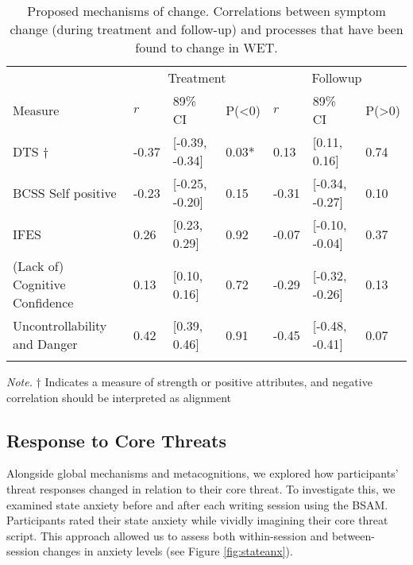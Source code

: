 \documentclass[
  man,floatsintext]{apa7}
\begin{document}
\begin{table}[tbp]

\begin{center}
\begin{threeparttable}

\caption{\label{tab:mechanisms.table}Proposed mechanisms of change. Correlations between symptom change (during treatment and follow-up) and processes that have been found to change in WET.}

\begin{tabular}{lllllll}
\toprule
 & \multicolumn{3}{c}{Treatment} & \multicolumn{3}{c}{Followup} \\
\cmidrule(r){2-4} \cmidrule(r){5-7}
Measure & $r$ & 89\% CI & P(<0) & $r$ & 89\% CI & P(>0)\\
\midrule
DTS † & -0.37 & {}[-0.39, -0.34] & 0.03* & 0.13 & {}[0.11, 0.16] & 0.74\\
BCSS Self positive & -0.23 & {}[-0.25, -0.20] & 0.15 & -0.31 & {}[-0.34, -0.27] & 0.10\\
IFES & 0.26 & {}[0.23, 0.29] & 0.92 & -0.07 & {}[-0.10, -0.04] & 0.37\\
(Lack of) Cognitive Confidence & 0.13 & {}[0.10, 0.16] & 0.72 & -0.29 & {}[-0.32, -0.26] & 0.13\\
Uncontrollability and Danger & 0.42 & {}[0.39, 0.46] & 0.91 & -0.45 & {}[-0.48, -0.41] & 0.07\\
\bottomrule
\addlinespace
\end{tabular}

\begin{tablenotes}[para]
\normalsize{\textit{Note.}  † Indicates a measure of strength or positive attributes, and negative correlation should be interpreted as alignment}
\end{tablenotes}

\end{threeparttable}
\end{center}

\end{table}

\subsection{Response to Core Threats}\label{response-to-core-threats}

Alongside global mechanisms and metacognitions, we explored how participants' threat responses changed in relation to their core threat.
To investigate this, we examined state anxiety before and after each writing session using the BSAM.
Participants rated their state anxiety while vividly imagining their core threat script.
This approach allowed us to assess both within-session and between-session changes in anxiety levels (see Figure \ref{fig:stateanx}).
\end{document}
